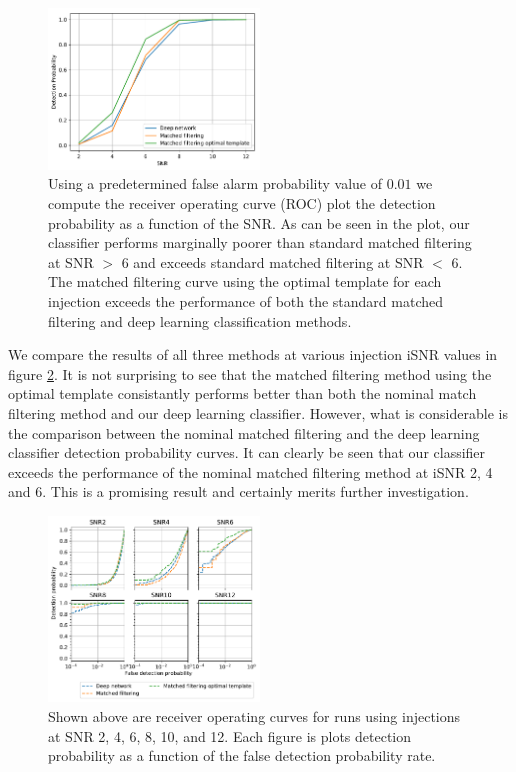 \documentclass[%
 amsmath,amssymb,
 aps,
 twocolumn,
 prl,
 reprint,
floatfix,
]{revtex4-1}
\begin{document}
\begin{figure}[] 
\includegraphics[width=0.5\textwidth] {figures/accuracy.pdf}
\caption{\label{fig:ROC_curve} Using a predetermined false alarm probability
value of $0.01$ we compute the receiver operating curve (ROC) plot the
detection probability as a function of the SNR. As can be seen in the plot, our
classifier performs marginally poorer than standard matched filtering at SNR
$>$ 6 and exceeds standard matched filtering at SNR $<$ 6. The matched
filtering curve using the optimal template for each injection exceeds the
performance of both the standard matched filtering and deep learning
classification methods.} 
\end{figure}

We compare the results of all three methods at various injection iSNR values in
figure \ref{fig:isnr_curves}. It is not surprising to see that the matched
filtering method using the optimal template consistantly performs better than
both the nominal match filtering method and our deep learning classifier.
However, what is considerable is the comparison between the nominal matched
filtering and the deep learning classifier detection probability curves. It can
clearly be seen that our classifier exceeds the performance of the nominal
matched filtering method at iSNR 2, 4 and 6. This is a promising result and
certainly merits further investigation.  

\begin{figure}[] 
\includegraphics[width=0.5\textwidth] {figures/ROC_curves.pdf}
\caption{\label{fig:isnr_curves} Shown above are receiver operating curves for
runs using injections at SNR 2, 4, 6, 8, 10, and 12. Each figure is plots
detection probability as a function of the false detection probability rate.}
\end{figure}
\end{document}
